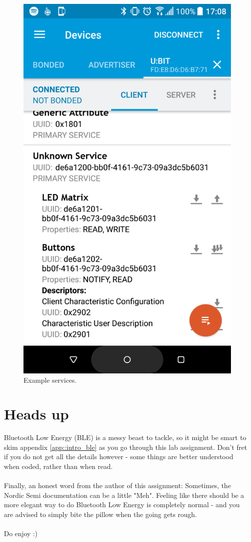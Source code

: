 \documentclass[11pt,a4paper]{article}
\begin{document}
\begin{figure}[ht]
\begin{minipage}{0.5\linewidth}
\includegraphics[width=0.9\linewidth]{example_connect_gatt.png}
\caption{Example services.}
\label{fig::example_services}
\end{minipage}
\end{figure}

\newpage
\noindent
\setcounter{section}{0}
\renewcommand{\thesection}{\arabic{section}}
\renewcommand{\thesubsection}{\arabic{section}.\arabic{subsection}}

\section{Heads up}
Bluetooth Low Energy (BLE) is a messy beast to tackle, so it might be smart to skim appendix \ref{app::intro_ble} as you go through this lab assignment. Don't fret if you do not get all the details however - some things are better understood when coded, rather than when read.\\
\\
Finally, an honest word from the author of this assignment: Sometimes, the Nordic Semi documentation can be a little "Meh". Feeling like there should be a more elegant way to do Bluetooth Low Energy is completely normal - and you are advised to simply bite the pillow when the going gets rough.\\
\\
Do enjoy :)
\end{document}
